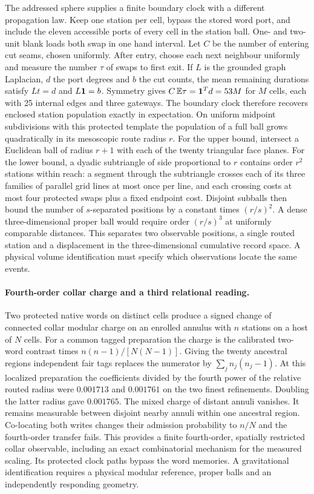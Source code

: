 \documentclass[11pt]{article}
\begin{document}
The addressed sphere supplies a finite boundary clock with a different
propagation law. Keep one station per cell, bypass the stored word port,
and include the eleven accessible ports of every cell in the station ball.
One- and two-unit blank loads both swap in one hand interval. Let \(C\)
be the number of entering cut seams, chosen uniformly. After entry, choose
each next neighbour uniformly and measure the number \(\tau\) of swaps to
first exit. If \(L\) is the grounded graph Laplacian, \(d\) the port degrees
and \(b\) the cut counts, the mean remaining durations satisfy \(Lt=d\)
and \(L{\bf1}=b\). Symmetry gives \(C\,\mathbb E\tau={\bf1}^Td=53M\)
for \(M\) cells, each with 25 internal edges and three gateways. The boundary
clock therefore recovers enclosed station population exactly in expectation.
On uniform midpoint subdivisions with this protected template the
population of a full ball grows quadratically in its mesoscopic route
radius \(r\). For the upper bound, intersect a Euclidean ball of radius
\(r+1\) with each of the twenty triangular face planes. For the lower bound,
a dyadic subtriangle of side proportional to \(r\) contains order \(r^2\)
stations within reach: a segment through the subtriangle crosses each of
its three families of parallel grid lines at most once per line, and each
crossing costs at most four protected swaps plus a fixed endpoint cost.
Disjoint subballs then bound the number of \(s\)-separated positions by a
constant times \((r/s)^2\). A dense three-dimensional proper ball would
require order \((r/s)^3\) at uniformly comparable distances. This separates
two observable positions, a single routed station and a displacement in
the three-dimensional cumulative record space. A physical volume
identification must specify which observations locate the same events.

\paragraph{Fourth-order collar charge and a third relational reading.}
Two protected native words on distinct cells produce a signed change
of connected collar modular charge on an enrolled annulus with $n$
stations on a host of $N$ cells. For a common tagged preparation the
charge is the calibrated two-word contrast times $n(n-1)/[N(N-1)]$.
Giving the twenty ancestral regions independent fair tags replaces the
numerator by $\sum_j n_j(n_j-1)$. At this localized preparation the
coefficients divided by the fourth power of the relative routed radius
were $0.001713$ and $0.001761$ on the two finest refinements. Doubling
the latter radius gave $0.001765$. The mixed charge of distant annuli
vanishes. It remains measurable between disjoint nearby annuli within
one ancestral region. Co-locating both writes changes their admission
probability to $n/N$ and the fourth-order transfer fails. This provides
a finite fourth-order, spatially restricted collar observable, including
an exact combinatorial mechanism for the measured scaling. Its
protected clock paths bypass the word memories. A gravitational
identification requires a physical modular reference, proper balls and
an independently responding geometry.
\end{document}
